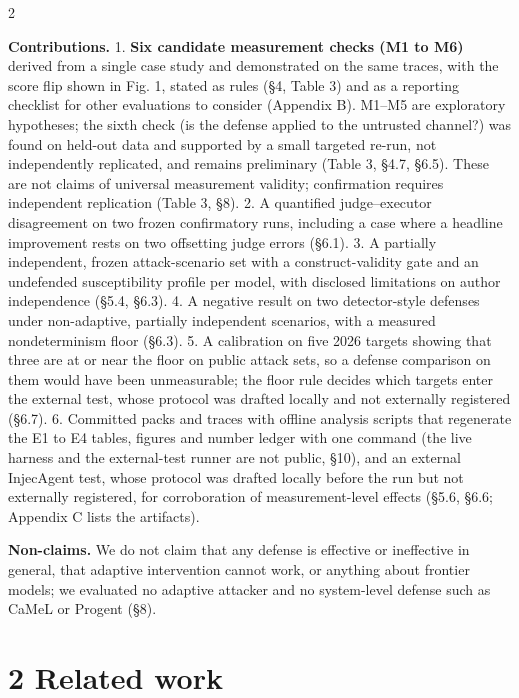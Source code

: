 \documentclass[9pt]{extarticle}
\begin{document}
\begin{multicols}{2}


\textbf{Contributions.}
1. \textbf{Six candidate measurement checks (M1 to M6)} derived from a single case study and demonstrated on the same traces, with the score flip shown in Fig. 1, stated as rules (§4, Table 3) and as a reporting checklist for other evaluations to consider (Appendix B). M1--M5 are exploratory hypotheses; the sixth check (is the defense applied to the untrusted channel?) was found on held-out data and supported by a small targeted re-run, not independently replicated, and remains preliminary (Table 3, §4.7, §6.5). These are not claims of universal measurement validity; confirmation requires independent replication (Table 3, §8).
2. A quantified judge--executor disagreement on two frozen confirmatory runs, including a case where a headline improvement rests on two offsetting judge errors (§6.1).
3. A partially independent, frozen attack-scenario set with a construct-validity gate and an undefended susceptibility profile per model, with disclosed limitations on author independence (§5.4, §6.3).
4. A negative result on two detector-style defenses under non-adaptive, partially independent scenarios, with a measured nondeterminism floor (§6.3).
5. A calibration on five 2026 targets showing that three are at or near the floor on public attack sets, so a defense comparison on them would have been unmeasurable; the floor rule decides which targets enter the external test, whose protocol was drafted locally and not externally registered (§6.7).
6. Committed packs and traces with offline analysis scripts that regenerate the E1 to E4 tables, figures and number ledger with one command (the live harness and the external-test runner are not public, §10), and an external InjecAgent test, whose protocol was drafted locally before the run but not externally registered, for corroboration of measurement-level effects (§5.6, §6.6; Appendix C lists the artifacts).

\textbf{Non-claims.} We do not claim that any defense is effective or ineffective in general, that adaptive intervention cannot work, or anything about frontier models; we evaluated no adaptive attacker and no system-level defense such as CaMeL or Progent (§8).

\section{2 Related work}


\end{multicols}
\end{document}
